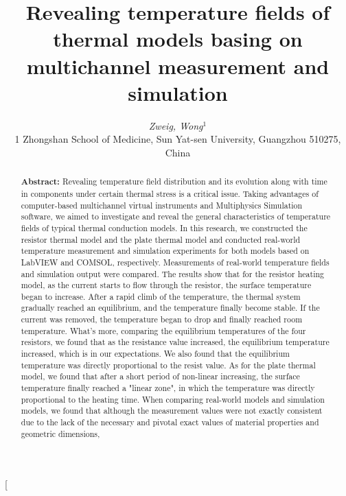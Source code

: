 \documentclass[10pt,a4paper,twocolumn,twoside,UTF8]{article}
\begin{document}
\title{\LARGE\textbf{Revealing temperature fields of thermal models basing on multichannel measurement and simulation} \footnotemark[1]}
\author{\large\textit{Zweig, Wong}$^{1}$\footnotemark[2]
\\ \normalsize{1 Zhongshan School of Medicine, Sun Yat-sen University, Guangzhou  { \rm 510275}, China}}
\date{}

\twocolumn[
	\begin{@twocolumnfalse}
	\maketitle  
	\renewcommand{\abstractname} {} 
	\begin{abstract}
	\vspace{-3em}
	{\bf Abstract: }
	{\small Revealing temperature field distribution and its evolution along with time in components under certain thermal stress is a critical issue.
	Taking advantages of computer-based multichannel virtual instruments and Multiphysics Simulation software, we aimed to investigate and reveal the general characteristics of temperature fields of typical thermal conduction models.
	In this research, we constructed the resistor thermal model and the plate thermal model and conducted real-world temperature measurement and simulation experiments for both models based on LabVIEW and COMSOL, respectively.
	Measurements of real-world temperature fields and simulation output were compared.
	The results show that for the resistor heating model, as the current starts to flow through the resistor, the surface temperature began to increase.
	After a rapid climb of the temperature, the thermal system gradually reached an equilibrium, and the temperature finally become stable.
	If the current was removed, the temperature began to drop and finally reached room temperature.
	What's more, comparing the equilibrium temperatures of the four resistors, we found that as the resistance value increased, the equilibrium temperature increased, which is in our expectations.
	We also found that the equilibrium temperature was directly proportional to the resist value.
	As for the plate thermal model, we found that after a short period of non-linear increasing, the surface temperature finally reached a "linear zone", in which the temperature was directly proportional to the heating time.
	When comparing real-world models and simulation models, we found that although the measurement values were not exactly consistent due to the lack of the necessary and pivotal exact values of material properties and geometric dimensions, 
}
\end{abstract}
\end{@twocolumnfalse}
\end{document}
